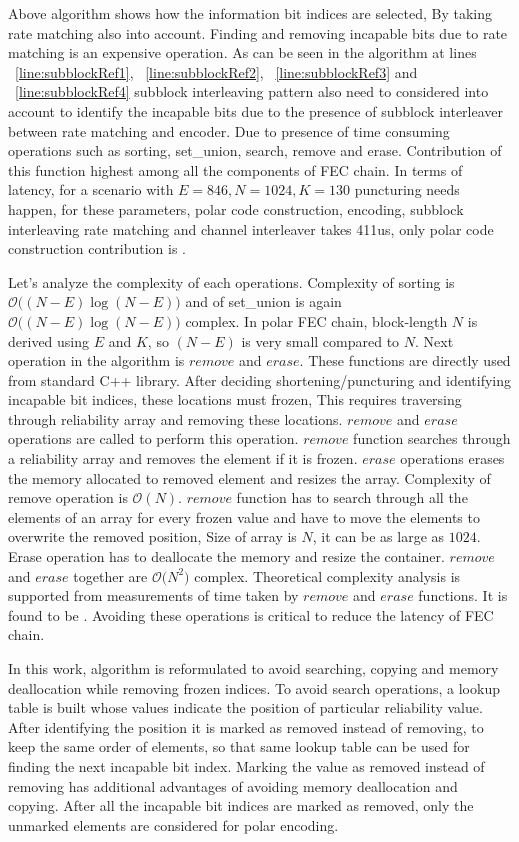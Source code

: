 Above algorithm shows how the information bit indices are selected, By taking rate matching also into account. Finding and removing incapable bits due to rate matching is an expensive operation. As can be seen in the algorithm at lines ~\ref{line:subblockRef1}, ~\ref{line:subblockRef2}, ~\ref{line:subblockRef3} and ~\ref{line:subblockRef4} subblock interleaving pattern also need to considered into account to identify the incapable bits due to the presence of subblock interleaver between rate matching and encoder. Due to presence of time consuming operations such as sorting, set\_union, search, remove and erase. Contribution of this function highest among all the components of FEC chain. In terms of latency, for a scenario with $E = 846, N = 1024, K = 130$ puncturing needs happen, for these parameters, polar code construction, encoding, subblock interleaving rate matching and channel interleaver takes 411us, only polar code construction contribution is . 

Let's analyze the complexity of each operations. Complexity of sorting is $\mathcal{O}\big((N-E)\log{}(N-E)\big)$ and of set\_union is again $\mathcal{O}\big((N-E)\log{}(N-E)\big)$ complex. In polar FEC chain, block-length $N$ is derived using $E$ and $K$, so $(N-E)$ is very small compared to $N$. Next operation in the algorithm is $remove$ and $erase$. These functions are directly used from standard C++ library. After deciding shortening/puncturing and identifying incapable bit indices, these locations must frozen, This requires traversing through reliability array and removing these locations. $remove$ and $erase$ operations are called to perform this operation. $remove$ function searches through a reliability array and removes the element if it is frozen. $erase$ operations erases the memory allocated to removed element and resizes the array. Complexity of remove operation is $\mathcal{O}(N)$. $remove$ function has to search through all the elements of an array for every frozen value and have to move the elements to overwrite the removed position, Size of array is $N$, it can be as large as $1024$. Erase operation has to deallocate the memory and resize the container. $remove$ and $erase$ together are $\mathcal{O}\big(N^2\big)$ complex. Theoretical complexity analysis is supported from measurements of time taken by $remove$ and $erase$ functions. It is found to be . Avoiding these operations is critical to reduce the latency of FEC chain.

In this work, algorithm is reformulated to avoid searching, copying and memory deallocation while removing frozen indices. To avoid search operations, a lookup table is built whose values indicate the position of particular reliability value. After identifying the position it is marked as removed instead of removing, to keep the same order of elements, so that same lookup table can be used for finding the next incapable bit index. Marking the value as removed instead of removing has additional advantages of avoiding memory deallocation and copying. After all the incapable bit indices are marked as removed, only the unmarked elements are considered for polar encoding.

